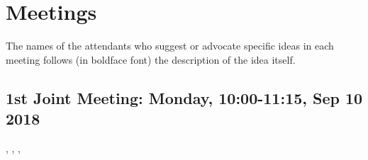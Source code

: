 \chapter{Meetings}
\label{sec:meetings}

The names of the attendants who suggest or advocate specific ideas in each meeting follows (in boldface font) the description of the idea itself.


\section{1st Joint Meeting: Monday, 10:00-11:15, Sep 10 2018}
\label{sec:meetings:20180910}

    \people
        \amirs, \amirf, \leili, \daniel
        \newpar


